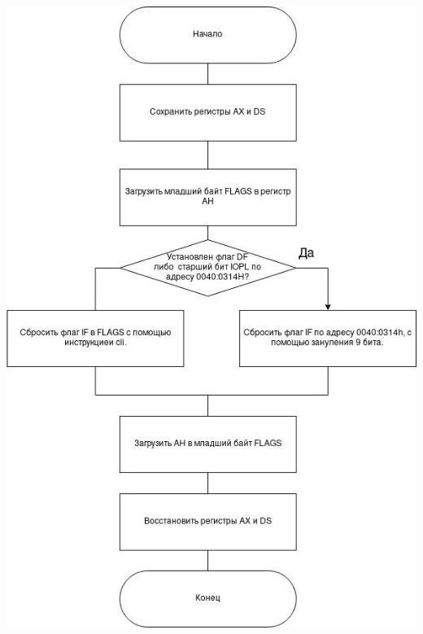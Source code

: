 \documentclass[a4paper,12pt]{article}
\begin{document}
\begin{center}
	\includegraphics[scale=0.76]{../src/int8h_sub_1.jpg}
\end{center}
\end{document}
